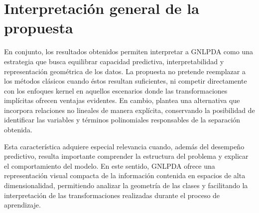 \section{Interpretación general de la propuesta}

En conjunto, los resultados obtenidos permiten interpretar a GNLPDA como una estrategia que busca equilibrar capacidad predictiva, interpretabilidad y representación geométrica de los datos. La propuesta no pretende reemplazar a los métodos clásicos cuando éstos resultan suficientes, ni competir directamente con los enfoques kernel en aquellos escenarios donde las transformaciones implícitas ofrecen ventajas evidentes. En cambio, plantea una alternativa que incorpora relaciones no lineales de manera explícita, conservando la posibilidad de identificar las variables y términos polinomiales responsables de la separación obtenida.

Esta característica adquiere especial relevancia cuando, además del desempeño predictivo, resulta importante comprender la estructura del problema y explicar el comportamiento del modelo. En este sentido, GNLPDA ofrece una representación visual compacta de la información contenida en espacios de alta dimensionalidad, permitiendo analizar la geometría de las clases y facilitando la interpretación de las transformaciones realizadas durante el proceso de aprendizaje.



